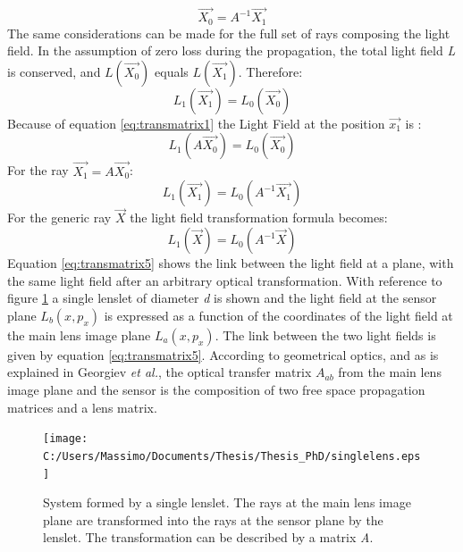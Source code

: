    \begin{equation}
   \label{eq:transmatrix2}
   \overrightarrow{X_0}=A^{-1}\overrightarrow{X_1}
   \end{equation}
   The same considerations can be made for the full set of rays composing the light field. In the assumption of zero loss during the propagation, the total light field \textit{L} is conserved, and $L(\overrightarrow{X_0})$ equals $L(\overrightarrow{X_1})$. Therefore:
   \begin{equation}
   \label{eq:transmatrix3}
   L_1(\overrightarrow{X_1})=L_0(\overrightarrow{X_0})
   \end{equation} 
   Because of equation \ref{eq:transmatrix1} the Light Field at the position $\overrightarrow{x_1}$ is :
   \begin{equation}
   \label{eq:transmatrix4}
   L_1(A\overrightarrow{X_0})=L_0(\overrightarrow{X_0})
   \end{equation}
   For the ray $\overrightarrow{X_1}=A\overrightarrow{X_0}$:
   \begin{equation}
   \label{eq:transmatrix8}
   L_1(\overrightarrow{X_1})=L_0(A^{-1}\overrightarrow{X_1})
   \end{equation}
   For the generic ray $\overrightarrow{X}$ the light field transformation formula becomes:
   \begin{equation}
   \label{eq:transmatrix5}
   L_1(\overrightarrow{X})=L_0(A^{-1}\overrightarrow{X})
   \end{equation}
   Equation \ref{eq:transmatrix5} shows the link between the light field at a plane, with the same light field after an arbitrary optical transformation.
     With reference to figure \ref{fig:basystem} a single lenslet of diameter \textit{d} is shown and the light field at the sensor plane $L_b(x,p_x)$ is expressed as a function of the coordinates of the light field at the main lens image plane $L_a(x,p_x)$. The link between the two light fields is given by equation \ref{eq:transmatrix5}. According to geometrical optics, and as is explained in Georgiev \textit{et al.}\cite{georgiev2011plenoptic}, the optical transfer matrix $A_{ab}$ from the main lens image plane and the sensor is the composition of two free space propagation matrices and a lens matrix.
      \begin{figure}[H]
      	\centering
      	\texttt{[image: C:/Users/Massimo/Documents/Thesis/Thesis\_PhD/singlelens.eps]}
      	\caption{\label{fig:basystem} System formed by a single lenslet. The rays at the main lens image plane are transformed into the rays at the sensor plane by the lenslet. The transformation can be described by a matrix \textit{A}. }
      \end{figure}
